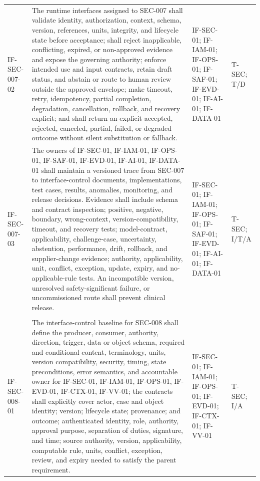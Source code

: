 \documentclass[11pt,letterpaper]{article}
\begin{document}
\begin{scriptsize}
\begin{longtable}{@{}L{0.14\textwidth}L{0.49\textwidth}L{0.19\textwidth}L{0.10\textwidth}@{}}
\addlinespace[2pt]
\mbox{IF-SEC-007-02} & The runtime interfaces assigned to SEC-007 shall validate identity, authorization, context, schema, version, references, units, integrity, and lifecycle state before acceptance; shall reject inapplicable, conflicting, expired, or non-approved evidence and expose the governing authority; enforce intended use and input contracts, retain draft status, and abstain or route to human review outside the approved envelope; make timeout, retry, idempotency, partial completion, degradation, cancellation, rollback, and recovery explicit; and shall return an explicit accepted, rejected, canceled, partial, failed, or degraded outcome without silent substitution or fallback. & IF-SEC-01; IF-IAM-01; IF-OPS-01; IF-SAF-01; IF-EVD-01; IF-AI-01; IF-DATA-01 & T-SEC; T\slash\allowbreak{}D \\
\addlinespace[2pt]
\mbox{IF-SEC-007-03} & The owners of IF-SEC-01, IF-IAM-01, IF-OPS-01, IF-SAF-01, IF-EVD-01, IF-AI-01, IF-DATA-01 shall maintain a versioned trace from SEC-007 to interface-control documents, implementations, test cases, results, anomalies, monitoring, and release decisions. Evidence shall include schema and contract inspection; positive, negative, boundary, wrong-context, version-compatibility, timeout, and recovery tests; model-contract, applicability, challenge-case, uncertainty, abstention, performance, drift, rollback, and supplier-change evidence; authority, applicability, unit, conflict, exception, update, expiry, and no-applicable-rule tests. An incompatible version, unresolved safety-significant failure, or uncommissioned route shall prevent clinical release. & IF-SEC-01; IF-IAM-01; IF-OPS-01; IF-SAF-01; IF-EVD-01; IF-AI-01; IF-DATA-01 & T-SEC; I\slash\allowbreak{}T\slash\allowbreak{}A \\
\addlinespace[2pt]
 \\
\addlinespace[2pt]
\mbox{IF-SEC-008-01} & The interface-control baseline for SEC-008 shall define the producer, consumer, authority, direction, trigger, data or object schema, required and conditional content, terminology, units, version compatibility, security, timing, state preconditions, error semantics, and accountable owner for IF-SEC-01, IF-IAM-01, IF-OPS-01, IF-EVD-01, IF-CTX-01, IF-VV-01; the contracts shall explicitly cover actor, case and object identity; version; lifecycle state; provenance; and outcome; authenticated identity, role, authority, approval purpose, separation of duties, signature, and time; source authority, version, applicability, computable rule, units, conflict, exception, review, and expiry needed to satisfy the parent requirement. & IF-SEC-01; IF-IAM-01; IF-OPS-01; IF-EVD-01; IF-CTX-01; IF-VV-01 & T-SEC; I\slash\allowbreak{}A \\

\end{longtable}
\end{scriptsize}
\end{document}

